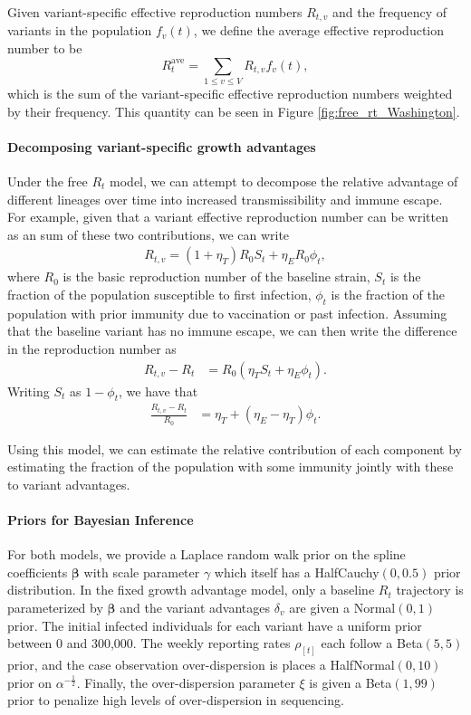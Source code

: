 \documentclass[11pt,oneside,letterpaper]{article}
\renewcommand{\vec}[1]{\boldsymbol{#1}}
\begin{document}
Given variant-specific effective reproduction numbers $R_{t,v}$ and the frequency of variants in the population $f_{v}(t)$, we define the average effective reproduction number to be
\begin{equation}
  R_{t}^{\text{ave}} = \sum_{1\leq v \leq V} R_{t,v}f_{v}(t),
\end{equation}
which is the sum of the variant-specific effective reproduction numbers weighted by their frequency. This quantity can be seen in Figure \ref{fig:free_rt_Washington}.

\paragraph{Decomposing variant-specific growth advantages}%

Under the free $R_{t}$ model, we can attempt to decompose the relative advantage of different lineages over time into increased transmissibility and immune escape. For example, given that a variant effective reproduction number can be written as an sum of these two contributions, we can write
\begin{align*}
  R_{t,v} = (1+\eta_{T}) R_{0} S_{t} + \eta_{E} R_{0} \phi_{t},
\end{align*}
where $R_{0}$ is the basic reproduction number of the baseline strain, $S_{t}$ is the fraction of the population susceptible to first infection, $\phi_{t}$ is the fraction of the population with prior immunity due to vaccination or past infection. Assuming that the baseline variant has no immune escape, we can then write the difference in the reproduction number as
\begin{align*}
  R_{t,v} - R_{t} &= R_{0} (\eta_{T} S_{t} + \eta_{E} \phi_{t}).
\end{align*}
Writing $S_{t}$ as $1 - \phi_{t}$, we have that
\begin{align*}
  \frac{R_{t,v}-R_{t}}{R_{0}} &= \eta_{T} + (\eta_{E} - \eta_{T})\phi_{t}.
\end{align*}

Using this model, we can estimate the relative contribution of each component by estimating the fraction of the population with some immunity jointly with these to variant advantages.

\paragraph{Priors for Bayesian Inference}%

For both models, we provide a Laplace random walk prior on the spline coefficients $\vec{\beta}$ with scale parameter $\gamma$ which itself has a HalfCauchy$(0,0.5)$ prior distribution.
In the fixed growth advantage model, only a baseline $R_{t}$ trajectory is parameterized by $\vec{\beta}$ and the variant advantages $\delta_{v}$ are given a Normal$(0,1)$ prior.
The initial infected individuals for each variant have a uniform prior between 0 and 300,000.
The weekly reporting rates $\rho_{[t]}$ each follow a Beta$(5, 5)$ prior, and the case observation over-dispersion is places a HalfNormal$(0, 10)$ prior on $\alpha^{-\frac{1}{2}}$.
Finally, the over-dispersion parameter $\xi$ is given a Beta$(1, 99)$ prior to penalize high levels of over-dispersion in sequencing.
\end{document}
